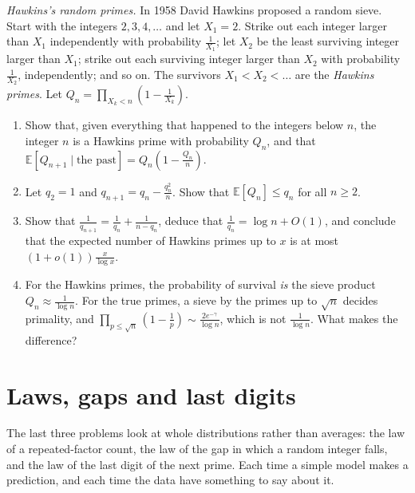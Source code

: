 \begin{exercise}[$\star\star$]\label{pb:hawkins}
\emph{Hawkins's random primes.} In 1958 David Hawkins proposed a random sieve. Start with the integers $2,3,4,\dots$ and let $X_1=2$. Strike out each integer larger than $X_1$
independently with probability $\frac1{X_1}$; let $X_2$ be the least surviving integer larger than $X_1$; strike out each surviving integer larger than $X_2$ with
probability $\frac1{X_2}$, independently; and so on. The survivors $X_1<X_2<\dots$ are the \emph{Hawkins primes}. Let $Q_n=\prod_{X_k<n}(1-\frac1{X_k})$.
\begin{enumerate}[label=(\alph*)]
\item Show that, given everything that happened to the integers below $n$, the integer $n$ is a Hawkins prime with probability $Q_n$, and that
$\mathbb E[Q_{n+1}\mid\text{the past}]=Q_n(1-\frac{Q_n}n)$.
\item Let $q_2=1$ and $q_{n+1}=q_n-\frac{q_n^2}n$. Show that $\mathbb E[Q_n]\le q_n$ for all $n\ge2$.
\item Show that $\frac1{q_{n+1}}=\frac1{q_n}+\frac1{n-q_n}$, deduce that $\frac1{q_n}=\log n+O(1)$, and conclude that the expected number of Hawkins primes up to $x$ is at most
$(1+o(1))\frac x{\log x}$.
\item For the Hawkins primes, the probability of survival \emph{is} the sieve product $Q_n\approx\frac1{\log n}$. For the true primes, a sieve by the primes up to $\sqrt n$
decides primality, and $\prod_{p\le\sqrt n}(1-\frac1p)\sim\frac{2e^{-\gamma}}{\log n}$, which is not $\frac1{\log n}$. What makes the difference?
\end{enumerate}
\end{exercise}

\section{Laws, gaps and last digits}

The last three problems look at whole distributions rather than averages: the law of a repeated-factor count, the law of the gap in which a random integer falls,
and the law of the last digit of the next prime. Each time a simple model makes a prediction, and each time the data have something to say about it.

